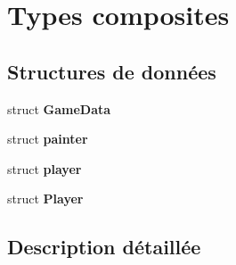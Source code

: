 \section{Types composites}
\label{group___composed___types}
\subsection*{Structures de données}
\begin{DoxyCompactItemize}
\item 
struct \textbf{ Game\+Data}
\item 
struct \textbf{ painter}
\item 
struct \textbf{ player}
\item 
struct \textbf{ Player}
\end{DoxyCompactItemize}


\subsection{Description détaillée}
